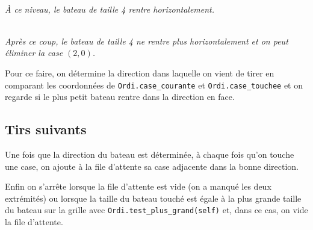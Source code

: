 \begin{center}
\\
\textit{À ce niveau, le bateau de taille 4 rentre horizontalement.}
\end{center}
\begin{center}
\\
\textit{Après ce coup, le bateau de taille 4 ne rentre plus horizontalement et on peut éliminer la case $(2,0)$.}
\end{center}
Pour ce faire, on détermine la direction dans laquelle on vient de tirer en comparant les coordonnées de \texttt{Ordi.case\_courante} et \texttt{Ordi.case\_touchee} et on regarde si le plus petit bateau rentre dans la direction en face.


\subsection{Tirs suivants}
Une fois que la direction du bateau est déterminée, à chaque fois qu'on touche une case, on ajoute à la file d'attente sa case adjacente dans la bonne direction.

Enfin on s'arrête lorsque la file d'attente est vide (on a manqué les deux extrémités) ou lorsque la taille du bateau touché est égale à la plus grande taille du bateau sur la grille avec \texttt{Ordi.test\_plus\_grand(self)} et, dans ce cas, on vide la file d'attente. 

